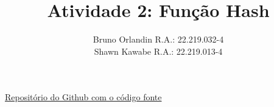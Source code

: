 \documentclass[rascunho,xindy,table]{fei}
\author{
    Bruno Orlandin R.A.: 22.219.032-4\\
    Shawn Kawabe R.A.: 22.219.013-4\\
}
\title{Atividade 2: Função Hash}
\begin{document}
\maketitle

\href{https://github.com/shawnkawabe/hash-fei.git}{Repositório do Github com o código fonte}




\end{document}
